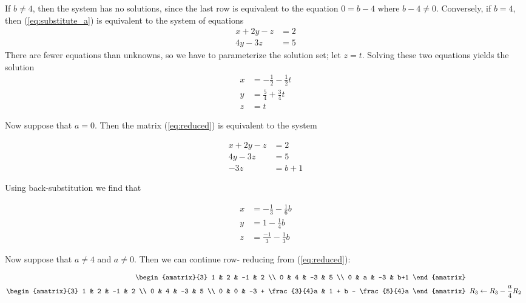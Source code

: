 \documentclass{article}
\begin{document}
If $b \neq 4$, then the system has no solutions, since the last row is
equivalent to the equation $0 = b-4$ where $b-4 \neq 0$.  Conversely, if
$b = 4$, then (\ref{eq:substitute_a}) is equivalent to the system of
equations
\begin{align*}
 x + 2y -z &= 2 \\
 4y - 3z &= 5
\end{align*}
There are fewer equations than unknowns, so we have to parameterize the
solution set; let $z = t$.  Solving these two equations yields the solution
\begin{equation}\begin{aligned}
 x &= -\frac{1}{2} - \frac{1}{2}t \\
 y &= \frac{5}{4} + \frac{3}{4}t \\
 z &= t
\end{aligned}\label{q4:inf}\end{equation}

Now suppose that $a = 0$.  Then the matrix (\ref{eq:reduced}) is equivalent
to the system

\begin{align*}
 x + 2y -z &= 2 \\
 4y -3z &= 5 \\
 -3z &= b+1
\end{align*}

Using back-substitution we find that

\begin{equation}\begin{aligned}
 x &= -\frac{1}{3} - \frac{1}{6}b \\
 y &= 1 - \frac{1}{4}b \\
 z &= \frac{-1}{3} - \frac{1}{3}b
\end{aligned}\label{q4:a_zero}\end{equation}

Now suppose that $a \neq 4$ and $a \neq 0$.  Then we can continue row-
reducing from (\ref{eq:reduced}):

\begin{align}
 \begin{amatrix}{3}
  1 & 2 & -1 &   2 \\
  0 & 4 & -3 &   5 \\
  0 & a & -3 & b+1
 \end{amatrix} &
 \nonumber \\
 \begin{amatrix}{3}
  1 & 2 & -1 & 2 \\
  0 & 4 & -3 & 5 \\
  0 & 0 & -3 + \frac{3}{4}a & 1 + b - \frac{5}{4}a
 \end{amatrix}&
 \begin{array}{l}
  R_3 \leftarrow R_3 - \dfrac{a}{4}R_2
 \end{array} 
 \nonumber
\end{align}
\end{document}
